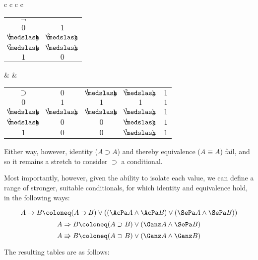 \begin{singlespace}
\begin{longtable}{ c c c c }
	\begin{tabular}{c | c}
		$\neg$ &  \\
		\cline{1-2} 
		$ 0  $ 			& $ 1  $ 		\\ 
		$ \oneThird $ 	& $ \twoThirds $ \\
		$ \twoThirds $ 	& $\oneThird $ 	\\
		$ 1  $ 			& $ 0  $ \\
	\end{tabular} 
		& &
	\begin{tabular}{c | c c c c}
		$\supset$ 		& $ 0  $			& $ \oneThird $ & $ \twoThirds $ & $ 1  $ \\
		\cline{1-5} 
		$ 0  $ 			& $ 1  $ 			& $ 1  $ 		& $ 1 $			& $ 1 $ \\
		$ \oneThird $ 	& $ \oneThird  $ 	& $ \oneThird  $ & $ \oneThird $	& $ 1  $ \\
		$ \twoThirds $	& $ 0  $			& $ 0 $ 		& $ \oneThird $	& $ 1  $ \\
		$ 1  $ 			& $ 0  $ 			& $ 0  $ 		& $ \oneThird $	& $ 1  $ \\
	\end{tabular}
\end{longtable}
\end{singlespace}

\noindent Either way, however, identity ($A \supset A$) and thereby equivalence ($A \equiv A$) fail, and so it remains a stretch to consider $\supset$ a conditional.

Most importantly, however, given the ability to isolate each value, we can define a range of stronger, suitable conditionals, for which identity and equivalence hold, in the following ways:


	\[A \arrow B \coloneq (A \supset B) \vee (( \GapLo A \wedge \GapLo B ) \vee (\GapHi A \wedge \GapHi B ))\]
	\[A \Rightarrow B \coloneq (A \supset B) \vee ( \Gap A \wedge \GapHi B )\]
	\[A \Rrightarrow B \coloneq (A \supset B) \vee ( \Gap A \wedge \Gap B )\]


\noindent The resulting tables are as follows:

